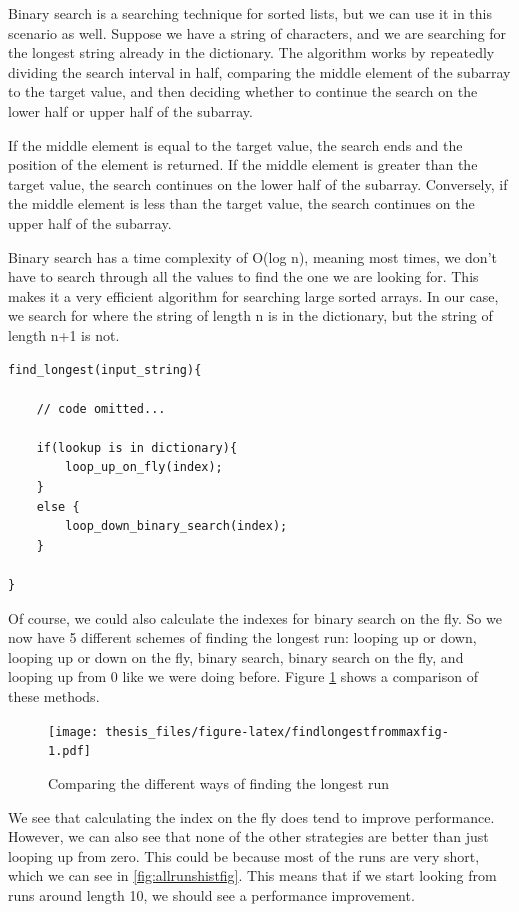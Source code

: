 \documentclass[12pt,twoside]{reedthesis}
\begin{document}
Binary search is a searching technique for sorted lists, but we can use it in this scenario as well. Suppose we have a string of characters, and we are searching for the longest string already in the dictionary. The algorithm works by repeatedly dividing the search interval in half, comparing the middle element of the subarray to the target value, and then deciding whether to continue the search on the lower half or upper half of the subarray.

If the middle element is equal to the target value, the search ends and the position of the element is returned. If the middle element is greater than the target value, the search continues on the lower half of the subarray. Conversely, if the middle element is less than the target value, the search continues on the upper half of the subarray.

Binary search has a time complexity of O(log n), meaning most times, we don't have to search through all the values to find the one we are looking for. This makes it a very efficient algorithm for searching large sorted arrays. In our case, we search for where the string of length n is in the dictionary, but the string of length n+1 is not.
\begin{verbatim}
find_longest(input_string){

    // code omitted...

    if(lookup is in dictionary){
        loop_up_on_fly(index);
    }
    else {
        loop_down_binary_search(index);
    }
    
}
\end{verbatim}
Of course, we could also calculate the indexes for binary search on the fly. So we now have 5 different schemes of finding the longest run: looping up or down, looping up or down on the fly, binary search, binary search on the fly, and looping up from 0 like we were doing before. Figure \ref{fig:findlongestfrommaxfig} shows a comparison of these methods.
\begin{figure}
\centering
\texttt{[image: thesis\_files/figure-latex/findlongestfrommaxfig-1.pdf]}
\caption{\label{fig:findlongestfrommaxfig}Comparing the different ways of finding the longest run}
\end{figure}
We see that calculating the index on the fly does tend to improve performance. However, we can also see that none of the other strategies are better than just looping up from zero. This could be because most of the runs are very short, which we can see in \ref{fig:allrunshistfig}. This means that if we start looking from runs around length 10, we should see a performance improvement.
\end{document}

